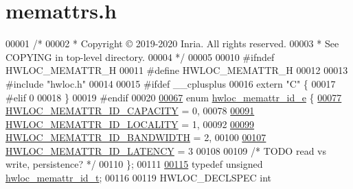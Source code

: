 \hypertarget{a00134_source}{}\section{memattrs.\+h}
\label{a00134_source}

\begin{DoxyCode}
00001 \textcolor{comment}{/*}
00002 \textcolor{comment}{ * Copyright © 2019-2020 Inria.  All rights reserved.}
00003 \textcolor{comment}{ * See COPYING in top-level directory.}
00004 \textcolor{comment}{ */}
00005 
00010 \textcolor{preprocessor}{#ifndef HWLOC\_MEMATTR\_H}
00011 \textcolor{preprocessor}{#define HWLOC\_MEMATTR\_H}
00012 
00013 \textcolor{preprocessor}{#include "hwloc.h"}
00014 
00015 \textcolor{preprocessor}{#ifdef \_\_cplusplus}
00016 \textcolor{keyword}{extern} \textcolor{stringliteral}{"C"} \{
00017 \textcolor{preprocessor}{#elif 0}
00018 \}
00019 \textcolor{preprocessor}{#endif}
00020 
\hyperlink{a00211_gab4bde745db676fc2ea4b47011cd9a80e}{00067} \textcolor{keyword}{enum} \hyperlink{a00211_gab4bde745db676fc2ea4b47011cd9a80e}{hwloc\_memattr\_id\_e} \{
\hyperlink{a00211_ggab4bde745db676fc2ea4b47011cd9a80eaa1cfa3ff3d56ff00ecabf7da4f5642cc}{00077}   \hyperlink{a00211_ggab4bde745db676fc2ea4b47011cd9a80eaa1cfa3ff3d56ff00ecabf7da4f5642cc}{HWLOC\_MEMATTR\_ID\_CAPACITY} = 0,
00078 
\hyperlink{a00211_ggab4bde745db676fc2ea4b47011cd9a80ea9334e3a4c30a67f491c6523255134efe}{00091}   \hyperlink{a00211_ggab4bde745db676fc2ea4b47011cd9a80ea9334e3a4c30a67f491c6523255134efe}{HWLOC\_MEMATTR\_ID\_LOCALITY} = 1,
00092 
\hyperlink{a00211_ggab4bde745db676fc2ea4b47011cd9a80ea25fe3c7376ae6f9b584bacdb039f8c0f}{00099}   \hyperlink{a00211_ggab4bde745db676fc2ea4b47011cd9a80ea25fe3c7376ae6f9b584bacdb039f8c0f}{HWLOC\_MEMATTR\_ID\_BANDWIDTH} = 2,
00100 
\hyperlink{a00211_ggab4bde745db676fc2ea4b47011cd9a80ead1796413759b8b87b61ad195a9349b19}{00107}   \hyperlink{a00211_ggab4bde745db676fc2ea4b47011cd9a80ead1796413759b8b87b61ad195a9349b19}{HWLOC\_MEMATTR\_ID\_LATENCY} = 3
00108 
00109   \textcolor{comment}{/* TODO read vs write, persistence? */}
00110 \};
00111 
\hyperlink{a00211_gacc82003a8610be554615995f0996c888}{00115} \textcolor{keyword}{typedef} \textcolor{keywordtype}{unsigned} \hyperlink{a00211_gacc82003a8610be554615995f0996c888}{hwloc\_memattr\_id\_t};
00116 
00119 HWLOC\_DECLSPEC \textcolor{keywordtype}{int}

\end{DoxyCode}
